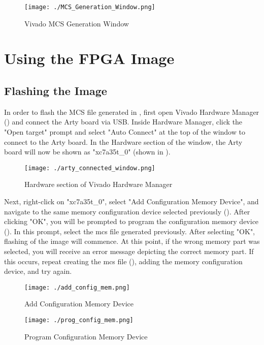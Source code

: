 	\begin{figure}[h!tbp]
		\centering
		\texttt{[image: ./MCS\_Generation\_Window.png]}
		\caption{Vivado MCS Generation Window}
		\label{fig:Vivado_MCS_Window}
	\end{figure}
	

\section{Using the FPGA Image}\label{sec:Using_FPGA_Image}
\subsection{Flashing the Image}\label{sec:Flash_FPGA_Image}
	In order to flash the MCS file generated in , first open Vivado Hardware Manager () and connect the Arty board via USB. 
	Inside Hardware Manager, click the "Open target" prompt and select "Auto Connect" at the top of the window to connect to the Arty board. 
	In the Hardware section of the window, the Arty board will now be shown as "xc7a35t\_0" (shown in ). 
	
	\begin{figure}[h!tbp]
		\centering
		\texttt{[image: ./arty\_connected\_window.png]}
		\caption{Hardware section of Vivado Hardware Manager}
		\label{fig:Vivado_HW_connected}
	\end{figure}
	
	Next, right-click on "xc7a35t\_0", select "Add Configuration Memory Device", and navigate to the same memory configuration device selected previously ().
	After clicking "OK", you will be prompted to program the configuration memory device (). 
	In this prompt, select the \Gls{mcs} file generated previously. 
	After selecting "OK", flashing of the image will commence. 
	At this point, if the wrong memory part was selected, you will receive an error message depicting the correct memory part. 
	If this occurs, repeat creating the \Gls{mcs} file (), adding the memory configuration device, and try again.
	
	\begin{figure}[h!tbp]
		\centering
		\texttt{[image: ./add\_config\_mem.png]}
		\caption{Add Configuration Memory Device}
		\label{fig:add_config_mem}
	\end{figure}
	
	\begin{figure}[h!tbp]
		\centering
		\texttt{[image: ./prog\_config\_mem.png]}
		\caption{Program Configuration Memory Device}
		\label{fig:prog_config_mem}
	\end{figure}

